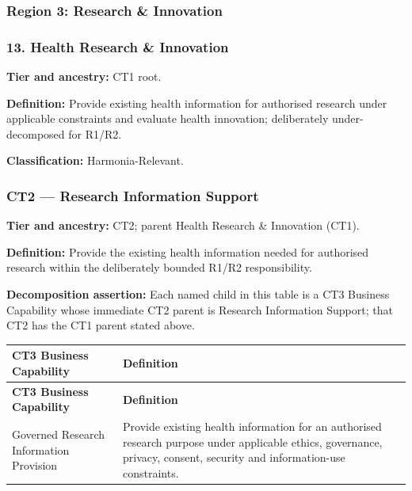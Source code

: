 \subsubsection*{Region 3: Research \& Innovation}
\label{rad:business:824}
\subsubsection*{13. Health Research \& Innovation}
\label{rad:business:826}

\textbf{Tier and ancestry:} CT1 root.

\label{rad:business:828}

\textbf{Definition:} Provide existing health information for authorised research under applicable constraints and evaluate health innovation; deliberately under-decomposed for R1/\allowbreak{}R2.

\label{rad:business:830}

\textbf{Classification:} Harmonia-Relevant.

\label{rad:business:832}
\subsubsection*{CT2 — Research Information Support}
\label{rad:business:834}

\textbf{Tier and ancestry:} CT2; parent Health Research \& Innovation (CT1).

\label{rad:business:836}

\textbf{Definition:} Provide the existing health information needed for authorised research within the deliberately bounded R1/\allowbreak{}R2 responsibility.

\label{rad:business:838}

\textbf{Decomposition assertion:} Each named child in this table is a CT3 Business Capability whose immediate CT2 parent is Research Information Support; that CT2 has the CT1 parent stated above.

\label{rad:business:840}
\begingroup\small\setlength{\TableWidth}{\dimexpr\linewidth-4\tabcolsep-3\arrayrulewidth\relax}
\begin{longtable}{|>{\raggedright\arraybackslash}p{0.35\TableWidth}|>{\raggedright\arraybackslash}p{0.65\TableWidth}|}
\hline\rowcolor{TableHead}\textbf{CT3 Business Capability} & \textbf{Definition}\\\hline\endfirsthead
\hline\rowcolor{TableHead}\textbf{CT3 Business Capability} & \textbf{Definition}\\\hline\endhead
\hline\endfoot
Governed Research Information Provision & Provide existing health information for an authorised research purpose under applicable ethics, governance, privacy, consent, security and information-use constraints.\\\hline
\end{longtable}\endgroup
{}\label{rad:business:844}

